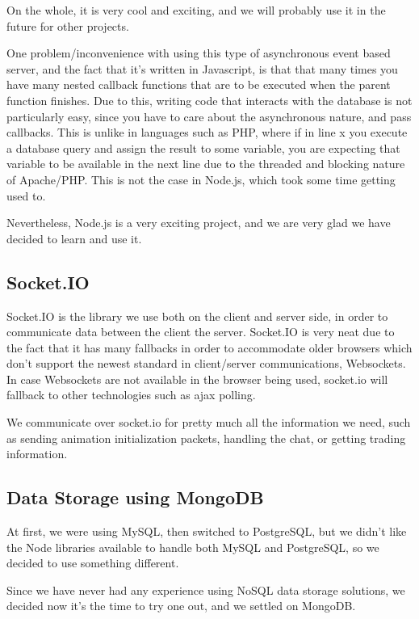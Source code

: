 \documentclass[a4paper,11pt]{article}
\begin{document}
			On the whole, it is very cool and exciting, and we will probably use it in the future for other projects.
			
			One problem/inconvenience with using this type of asynchronous event based server, and the fact that it's written in Javascript, is that that many times you have many nested callback functions that are to be executed when the parent function finishes. Due to this, writing code that interacts with the database is not particularly easy, since you have to care about the asynchronous nature, and pass callbacks. This is unlike in languages such as PHP, where if in line x you execute a database query and assign the result to some variable, you are expecting that variable to be available in the next line due to the threaded and blocking nature of Apache/PHP. This is not the case in Node.js, which took some time getting used to.
			
			Nevertheless, Node.js is a very exciting project, and we are very glad we have decided to learn and use it.		
		
		\subsection{Socket.IO}
		
			Socket.IO is the library we use both on the client and server side, in order to communicate data between the client the server. Socket.IO is very neat due to the fact that it has many fallbacks in order to accommodate older browsers which don't support the newest standard in client/server communications, Websockets. In case Websockets are not available in the browser being used, socket.io will fallback to other technologies such as ajax polling.
		
			We communicate over socket.io for pretty much all the information we need, such as sending animation initialization packets, handling the chat, or getting trading information.
		
		\subsection{Data Storage using MongoDB}
			At first, we were using MySQL, then switched to PostgreSQL, but we didn't like the Node libraries available to handle both MySQL and PostgreSQL, so we decided to use something different.
			 
			Since we have never had any experience using NoSQL data storage solutions, we decided now it's the time to try one out, and we settled on MongoDB.
			
\end{document}
